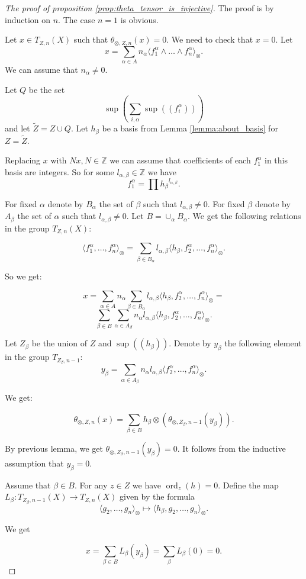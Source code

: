 \documentclass[12pt]{extarticle}
\def\mb{\mathbb}
\def\Z{\mb Z}
\def\wt{\widetilde}
\DeclareMathOperator{\ord}{ord}
\begin{document}
\begin{proof}[The proof of proposition \ref{prop:theta_tensor_is_injective}]
    The proof is by induction on $n$. The case $n=1$ is obvious.

    Let $x\in T_{ Z,n}(X)$ such that $\theta_{\otimes,Z,n}(x)=0$. We need to check that $x=0$. Let
    $$x=\sum_{\alpha\in A} n_\alpha\langle f_1^\alpha\wedge\dots\wedge f_n^\alpha\rangle_\otimes.$$
    We can assume that $n_\alpha\ne 0$.

    Let $Q$ be the set $$\sup\left(\sum_{i,\alpha}\sup((f_i^\alpha))\right)$$ and let $\wt Z=Z\cup Q$. Let $h_\beta$ be a basis from Lemma \ref{lemma:about_basis} for $Z=\wt Z$.

    Replacing $x$ with $Nx, N\in\mb Z$ we can assume that coefficients of each $f_1^\alpha$ in this basis are integers. So for some $l_{\alpha,\beta}\in\Z$ we have
    $$f_1^\alpha=\prod {h_\beta}^{l_{\alpha,\beta}}.$$

    For fixed $\alpha$ denote by $B_\alpha$ the set of $\beta$ such that $l_{\alpha,\beta}\ne 0$. For fixed $\beta$ denote by $A_\beta$ the set of $\alpha$ such that $l_{\alpha,\beta}\ne 0$. Let $B=\cup_\alpha B_\alpha$. We get the following relations in the group $T_{Z,n}(X)$:

    $$\langle f_1^\alpha,\dots, f_n^\alpha\rangle_\otimes=\sum_{\beta\in B_\alpha} l_{\alpha,\beta}\langle h_\beta,f_2^\alpha,\dots, f_n^\alpha\rangle_\otimes.$$

    So we get:

    $$x=\sum_{\alpha\in A} n_\alpha\sum_{\beta\in B_\alpha} l_{\alpha,\beta}\langle h_\beta,f_2^\alpha,\dots,f_n^\alpha\rangle_\otimes=$$
    $$\sum_{\beta\in B} \sum_{\alpha\in A_\beta} n_\alpha l_{\alpha,\beta}\langle h_\beta,f_2^\alpha,\dots,f_n^\alpha\rangle_\otimes.$$

    Let $Z_\beta$ be the union of $Z$ and $\sup((h_\beta))$. Denote by $y_\beta$ the following element in the group $T_{ Z_\beta, n-1}$:
    $$y_\beta = \sum_{\alpha\in A_\beta} n_\alpha l_{\alpha,\beta}\langle f_2^\alpha,\dots,f_n^\alpha\rangle_\otimes.$$

We get:

    $$\theta_{\otimes, Z,n}(x)=\sum_{\beta\in B} h_\beta\otimes (\theta_{\otimes, Z_\beta, n-1}(y_\beta)).$$

    By previous lemma, we get $\theta_{\otimes, Z_\beta, n-1}(y_\beta)=0$. It follows from the inductive assumption that $y_\beta=0$.

Assume that $\beta\in B$. For any $z\in Z$ we have $\ord_z(h)=0$. Define the map $L_\beta\colon T_{Z_\beta, n-1}(X)\to T_{ Z, n}(X)$ given by the formula
$$\langle g_2,\dots, g_n\rangle_\otimes\mapsto \langle h_\beta, g_2,\dots, g_n\rangle_\otimes.$$

We get

$$x=\sum_{\beta\in B} L_\beta(y_\beta)=\sum_\beta L_\beta(0)=0.$$
\end{proof}
\end{document}
